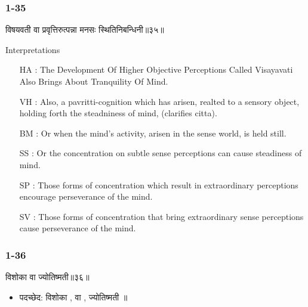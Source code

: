 \begin{frame}[fragile]\frametitle{ 1-35}
\begin{sanskrit}
विषयवती वा प्रवृत्तिरुत्पन्ना मनसः स्थितिनिबन्धिनी॥३५॥
\end{sanskrit}

Interpretations
\begin{itemize}	
\item [HA]: The Development Of Higher Objective Perceptions Called Visayavati Also Brings About Tranquility Of Mind.
\item [VH]: Also, a pavritti-cognition which has arisen, realted to a sensory object, holding forth the steadniness of mind, (clarifies citta).
\item [BM]: Or when the mind’s activity, arisen in the sense world, is held still.
\item [SS]: Or the concentration on subtle sense perceptions can cause steadiness of mind.
\item [SP]: Those forms of concentration which result in extraordinary perceptions encourage perseverance of the mind.
\item [SV]: Those forms of concentration that bring extraordinary sense perceptions cause perseverance of the mind. 
\end{itemize}
	
\end{frame}


\begin{frame}[fragile]\frametitle{1-36}
\begin{sanskrit}
विशोका वा ज्योतिष्मती॥३६॥
\end{sanskrit}

\begin{itemize}
\item पदच्छेद: विशोका , वा , ज्योतिष्मती ॥
\end{itemize}
	
\end{frame}

